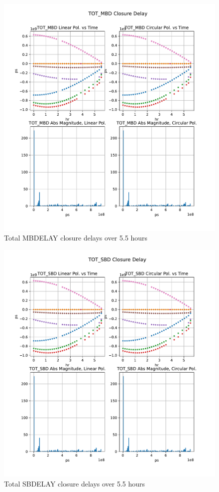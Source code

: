 \documentclass[letterpaper,twoside,12pt]{article}
\begin{document}
\begin{figure}[ht!]
  \begin{center}
  \includegraphics[width=40pc]{TOT_MBD_Closure_Delay.pdf}
  \caption{\small Total MBDELAY closure delays over 5.5 hours }
  \label{resid_mbd}
  \end{center}
\end{figure}


\begin{figure}[ht!]
  \begin{center}
  \includegraphics[width=40pc]{TOT_SBD_Closure_Delay.pdf}
  \caption{\small Total SBDELAY closure delays over 5.5 hours }
  \label{resid_mbd}
  \end{center}
\end{figure}
\end{document}

